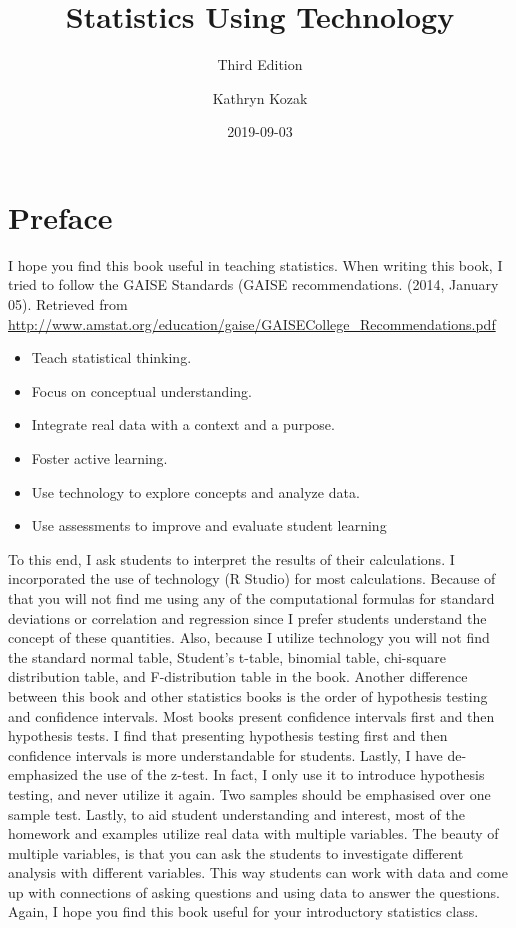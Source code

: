 \documentclass[]{book}
\title{Statistics Using Technology}
\subtitle{Third Edition}
\author{Kathryn Kozak}
\date{2019-09-03}
\providecommand{\tightlist}{%
  \setlength{\itemsep}{0pt}\setlength{\parskip}{0pt}}
\begin{document}
\maketitle

{
\setcounter{tocdepth}{1}
\tableofcontents
}
\hypertarget{preface}{%
\chapter*{Preface}\label{preface}}

I hope you find this book useful in teaching statistics. When writing this book, I tried to follow the GAISE Standards (GAISE recommendations. (2014, January 05). Retrieved from \url{http://www.amstat.org/education/gaise/GAISECollege_Recommendations.pdf}

\begin{itemize}
\tightlist
\item
  Teach statistical thinking.
\item
  Focus on conceptual understanding.
\item
  Integrate real data with a context and a purpose.
\item
  Foster active learning.
\item
  Use technology to explore concepts and analyze data.
\item
  Use assessments to improve and evaluate student learning
\end{itemize}

To this end, I ask students to interpret the results of their calculations. I incorporated the use of technology (R Studio) for most calculations. Because of that you will not find me using any of the computational formulas for standard deviations or correlation and regression since I prefer students understand the concept of these quantities. Also, because I utilize technology you will not find the standard normal table, Student's t-table, binomial table, chi-square distribution table, and F-distribution table in the book. Another difference between this book and other statistics books is the order of hypothesis testing and confidence intervals. Most books present confidence intervals first and then hypothesis tests. I find that presenting hypothesis testing first and then confidence intervals is more understandable for students. Lastly, I have de-emphasized the use of the z-test. In fact, I only use it to introduce hypothesis testing, and never utilize it again. Two samples should be emphasised over one sample test. Lastly, to aid student understanding and interest, most of the homework and examples utilize real data with multiple variables. The beauty of multiple variables, is that you can ask the students to investigate different analysis with different variables. This way students can work with data and come up with connections of asking questions and using data to answer the questions. Again, I hope you find this book useful for your introductory statistics class.
\end{document}
